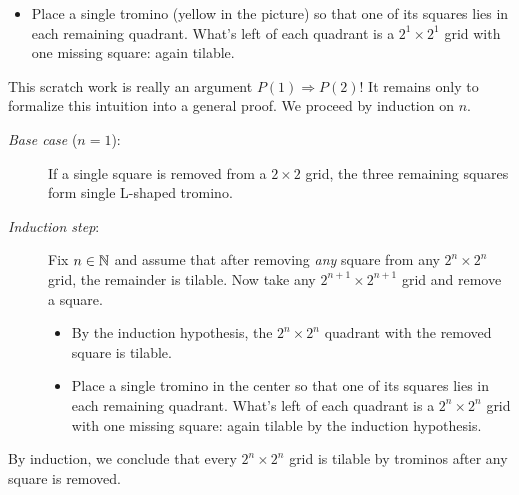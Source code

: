 \begin{example}{}{}
	\begin{itemize}
	 	\item Place a single tromino (yellow in the picture) so that one of its squares lies in each remaining quadrant. What's left of each quadrant is a $2^1\times 2^1$ grid with one missing square: again tilable.
	\end{itemize}
	
	This scratch work is really an argument $P(1)\Longrightarrow P(2)$! It remains only to formalize this intuition into a general proof. We proceed by induction on $n$.
	\begin{description}
		\item[\normalfont\emph{Base case} ($n=1$):] If a single square is removed from a $2\times 2$ grid, the three remaining squares form single L-shaped tromino.
		\item[\normalfont\emph{Induction step}:] Fix $n\in\mathbb{N}$ and assume that after removing \emph{any} square from any $2^n\times 2^n$ grid, the remainder is tilable. Now take any $2^{n+1}\times 2^{n+1}$ grid and remove a square.
	\begin{itemize}
	  \item By the induction hypothesis, the $2^n\times 2^n$ quadrant with the removed square is tilable.
	  \item Place a single tromino in the center so that one of its squares lies in each remaining quadrant. What's left of each quadrant is a $2^n\times 2^n$ grid with one missing square: again tilable by the induction hypothesis.
	\end{itemize}  
	\end{description}
	By induction, we conclude that every $2^n\times 2^n$ grid is tilable by trominos after any square is removed.
\end{example}


\goodbreak
% 
% 


